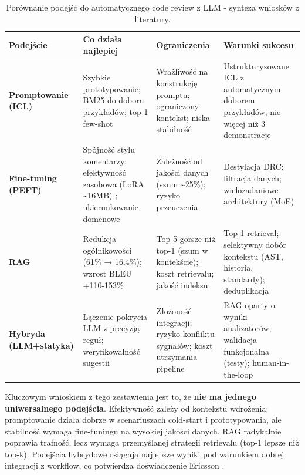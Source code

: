 \begin{table}[h]
\centering
\caption{Porównanie podejść do automatycznego code review z LLM - synteza wniosków z literatury.}
\label{tab:porownanie_podejsc}
\small
\begin{tabular}{p{2.4cm}p{3.8cm}p{3.8cm}p{3.8cm}}
\hline
\textbf{Podejście} & \textbf{Co działa najlepiej} & \textbf{Ograniczenia} & \textbf{Warunki sukcesu} \\
\hline
\textbf{Promptowanie (ICL)} & 
Szybkie prototypowanie; BM25 do doboru przykładów; top-1 few-shot \cite{Pornprasit2024FineTuningPromptingCR, Meng2025RARe} & 
Wrażliwość na konstrukcję promptu; ograniczony kontekst; niska stabilność \cite{Haider2024PromptingFineTuningRCG} & 
Ustrukturyzowane ICL z automatycznym doborem przykładów; nie więcej niż 3 demonstracje \\
\hline
\textbf{Fine-tuning (PEFT)} & 
Spójność stylu komentarzy; efektywność zasobowa (LoRA \textasciitilde16MB) \cite{Lu2023LLaMAReviewer}; ukierunkowanie domenowe & 
Zależność od jakości danych (szum \textasciitilde25\%); ryzyko przeuczenia \cite{Tufano2024CodeReviewAutomation, Yu2025Desiview} & 
Destylacja DRC; filtracja danych; wielozadaniowe architektury (MoE) \cite{Tang2025MoEReviewer, Yu2025Desiview} \\
\hline
\textbf{RAG} & 
Redukcja ogólnikowości (61\% → 16.4\%); wzrost BLEU +110-153\% \cite{Ren2025HydraReviewer, Meng2025RARe} & 
Top-5 gorsze niż top-1 (szum w kontekście); koszt retrievalu; jakość indeksu \cite{Meng2025RARe} & 
Top-1 retrieval; selektywny dobór kontekstu (AST, historia, standardy); deduplikacja \\
\hline
\textbf{Hybryda (LLM+statyka)} & 
Łączenie pokrycia LLM z precyzją reguł; weryfikowalność sugestii \cite{Jaoua2025LLMStaticAnalyzersCR, Ramesh2025EricssonExperience} & 
Złożoność integracji; ryzyko konfliktu sygnałów; koszt utrzymania pipeline & 
RAG oparty o wyniki analizatorów; walidacja funkcjonalna (testy); human-in-the-loop \\
\hline
\end{tabular}
\end{table}

Kluczowym wnioskiem z tego zestawienia jest to, że \textbf{nie ma jednego uniwersalnego podejścia}.
Efektywność zależy od kontekstu wdrożenia: promptowanie działa dobrze w scenariuszach cold-start
i prototypowania, ale stabilność wymaga fine-tuningu na wysokiej jakości danych. RAG radykalnie
poprawia trafność, lecz wymaga przemyślanej strategii retrievalu (top-1 lepsze niż top-k). Podejścia
hybrydowe osiągają najlepsze wyniki pod warunkiem dobrej integracji z workflow, co potwierdza
doświadczenie Ericsson \cite{Ramesh2025EricssonExperience}.

